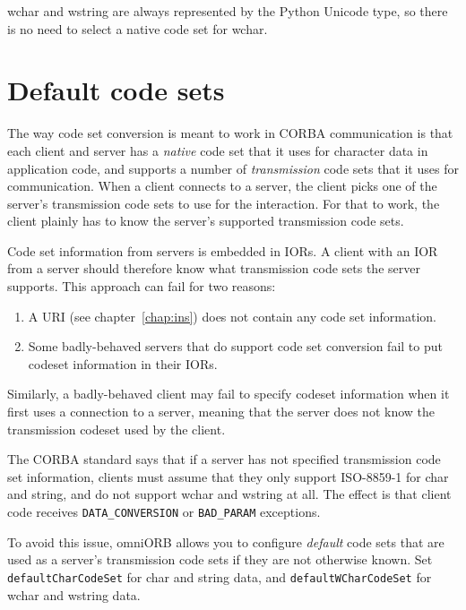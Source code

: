 \documentclass[11pt,oneside,a4paper]{book}
\newcommand{\code}[1]{\texttt{#1}}
\newcommand{\term}[1]{\textit{#1}}
\begin{document}
wchar and wstring are always represented by the Python Unicode type,
so there is no need to select a native code set for wchar.


\section{Default code sets}

The way code set conversion is meant to work in CORBA communication is
that each client and server has a \term{native} code set that it uses
for character data in application code, and supports a number of
\term{transmission} code sets that it uses for communication. When a
client connects to a server, the client picks one of the server's
transmission code sets to use for the interaction. For that to work,
the client plainly has to know the server's supported transmission
code sets.

Code set information from servers is embedded in IORs. A client with
an IOR from a server should therefore know what transmission code sets
the server supports. This approach can fail for two reasons:

\begin{enumerate}
  \item A  URI (see chapter~\ref{chap:ins}) does
    not contain any code set information.

  \item Some badly-behaved servers that do support code set conversion
    fail to put codeset information in their IORs.
\end{enumerate}

\noindent Similarly, a badly-behaved client may fail to specify
codeset information when it first uses a connection to a server,
meaning that the server does not know the transmission codeset used by
the client.

The CORBA standard says that if a server has not specified
transmission code set information, clients must assume that they only
support ISO-8859-1 for char and string, and do not support wchar and
wstring at all. The effect is that client code receives
\code{DATA\_CONVERSION} or \code{BAD\_PARAM} exceptions.

To avoid this issue, omniORB allows you to configure \term{default}
code sets that are used as a server's transmission code sets if they
are not otherwise known. Set \code{defaultCharCodeSet} for char and
string data, and \code{defaultWCharCodeSet} for wchar and wstring data.
\end{document}
